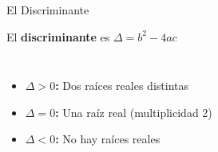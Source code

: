 \documentclass[aspectratio=169]{beamer}
\begin{document}
\begin{frame}{El Discriminante}
\begin{definition}
El \textbf{discriminante} es $\Delta = b^2 - 4ac$
\end{definition}

\vspace{0.5cm}
\begin{columns}
\begin{itemize}
\item<2-> \textcolor{mygreen}{\textbf{$\Delta > 0$:}} Dos raíces reales distintas
\item<3-> \textcolor{myblue}{\textbf{$\Delta = 0$:}} Una raíz real (multiplicidad 2)
\item<4-> \textcolor{myred}{\textbf{$\Delta < 0$:}} No hay raíces reales
\end{itemize}

\begin{center}
\end{center}
\end{columns}
\end{frame}
\end{document}
